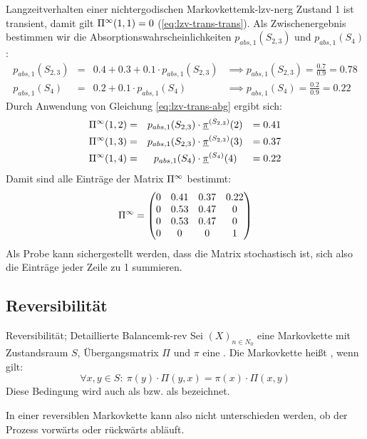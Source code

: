 \begin{example}{Langzeitverhalten einer nichtergodischen Markovkette}{mk-lzv-nerg}
Zustand 1 ist transient, damit gilt $\Pi^\infty(1,1) = 0$
(\eqref{eq:lzv-trans-trans}). Als Zwischenergebnis bestimmen wir die
Absorptionswahrscheinlichkeiten $p_{abs,1}(S_{2,3})$ und $p_{abs,1}(S_{4})$:
\begin{align*}
p_{abs,1}(S_{2,3}) &=&  0.4 + 0.3 + 0.1 \cdot p_{abs,1}(S_{2,3}) & \implies
p_{abs,1}(S_{2,3}) = \frac{0.7}{0.9} = 0.78  \\
p_{abs,1}(S_{4})   &=&  0.2 + 0.1 \cdot p_{abs,1}(S_4) &\implies
p_{abs,1}(S_4) =\frac{0.2}{0.9} = 0.22
\end{align*}
Durch Anwendung von Gleichung \eqref{eq:lzv-trans-abg} ergibt sich:
\begin{align*}
\Pi^\infty(1,2) &=& p_{abs,1}(S_{2,3}) &\cdot\underline{\pi}^{(S_{2,3})}(2) &= 0.41 \\
\Pi^\infty(1,3) &=& p_{abs,1}(S_{2,3}) &\cdot\underline{\pi}^{(S_{2,3})}(3) &= 0.37 \\
\Pi^\infty(1,4) &=& p_{abs,1}(S_4)     &\cdot\underline{\pi}^{(S_4)}    (4) &= 0.22
\end{align*}
Damit sind alle Einträge der Matrix $\Pi^\infty$ bestimmt:
\[
\Pi^\infty = \begin{pmatrix}
   0  & 0.41 & 0.37 & 0.22 \\
   0  & 0.53 & 0.47 &  0   \\
   0  & 0.53 & 0.47 &  0   \\
   0  &  0   &  0   &  1
\end{pmatrix}
\]
Als Probe kann sichergestellt werden, dass die Matrix stochastisch ist, sich
also die Einträge jeder Zeile zu 1 summieren.
\end{example}

\subsection{Reversibilität}

\begin{definition}{Reversibilität; Detaillierte Balance}{mk-rev}
Sei $(X)_{n\in N_0}$ eine Markovkette mit Zustandsraum $S$, Übergangsmatrix
$\Pi$ und $\pi$ eine . Die Markovkette heißt
, wenn gilt:
\[
\forall x,y\in S:\ \pi(y)\cdot\Pi(y,x) = \pi(x)\cdot\Pi(x,y)
\]
Diese Bedingung wird auch als  bzw. als
 bezeichnet.
\end{definition}

In einer reversiblen Markovkette kann also nicht unterschieden werden, ob der
Prozess vorwärts oder rückwärts abläuft.

